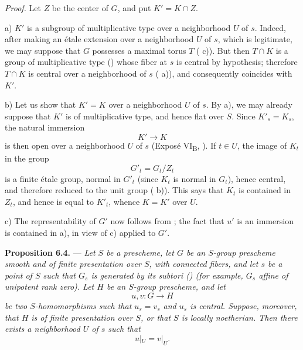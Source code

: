 \medskip
\noindent\textit{Proof.}
Let \(Z\) be the center of \(G\), and put \(K'=K\cap Z\).

\medskip
\noindent a) \(K'\) is a subgroup of multiplicative type over a
neighborhood \(U\) of \(s\). Indeed, after making an étale
extension over a neighborhood \(U\) of \(s\), which is legitimate,
we may suppose that \(G\) possesses a maximal torus \(T\)
( c)). But then \(T\cap K\) is a group of multiplicative type
() whose fiber at \(s\) is central by hypothesis;
therefore \(T\cap K\) is central over a neighborhood of \(s\)
( a)), and consequently coincides with \(K'\).

\medskip
\noindent b) Let us show that \(K'=K\) over a neighborhood \(U\)
of \(s\). By a), we may already suppose that \(K'\) is of
multiplicative type, and hence flat over \(S\). Since \(K'_s=K_s\),
the natural immersion
\[
  K'\longrightarrow K
\]
is then open over a neighborhood \(U\) of \(s\) (Exposé
VI\textsubscript{B}, ). If \(t\in U\), the image of \(K_t\) in
the group
\[
  G'_t=G_t/Z_t
\]
is a finite étale group, normal in \(G'_t\) (since \(K_t\) is
normal in \(G_t\)), hence central, and therefore reduced to the
unit group ( b)). This says that \(K_t\) is contained in
\(Z_t\), and hence is equal to \(K'_t\), whence \(K=K'\) over
\(U\).

\medskip
\noindent c) The representability of \(G'\) now follows from ;
the fact that \(u'\) is an immersion is contained in  a), in
view of  c) applied to \(G'\).

\medskip
\noindent{}%
\textbf{Proposition 6.4.} --- \textit{Let \(S\) be a prescheme,
let \(G\) be an \(S\)-group prescheme smooth and of finite
presentation over \(S\), with connected fibers, and let \(s\) be
a point of \(S\) such that \(G_s\) is generated by its subtori
() (for example, \(G_s\) affine of unipotent rank
zero). Let \(H\) be an \(S\)-group prescheme, and let}
\[
  u,v:G\longrightarrow H
\]
\textit{be two \(S\)-homomorphisms such that \(u_s=v_s\) and
\(u_s\) is central. Suppose, moreover, that \(H\) is of finite
presentation over \(S\), or that \(S\) is locally noetherian.
Then there exists a neighborhood \(U\) of \(s\) such that}
\[
  u|_U=v|_U.
\]

